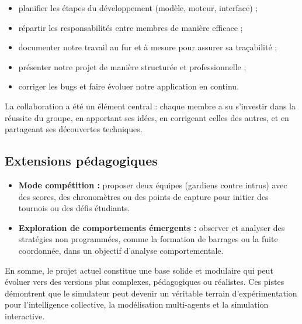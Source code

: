 \begin{itemize}
    \item planifier les étapes du développement (modèle, moteur, interface) ;
    \item répartir les responsabilités entre membres de manière efficace ;
    \item documenter notre travail au fur et à mesure pour assurer sa traçabilité ;
    \item présenter notre projet de manière structurée et professionnelle ;
    \item corriger les bugs et faire évoluer notre application en continu.
\end{itemize}

La collaboration a été un élément central : chaque membre a su s’investir dans la réussite du groupe, en apportant ses idées, en corrigeant celles des autres, et en partageant ses découvertes techniques.

\subsection{Extensions pédagogiques}

\begin{itemize}
    \item \textbf{Mode compétition :} proposer deux équipes (gardiens contre intrus) avec des scores, des chronomètres ou des points de capture pour initier des tournois ou des défis étudiants.

    \item \textbf{Exploration de comportements émergents :} observer et analyser des stratégies non programmées, comme la formation de barrages ou la fuite coordonnée, dans un objectif d’analyse comportementale.
    
   
\end{itemize}

\noindent En somme, le projet actuel constitue une base solide et modulaire qui peut évoluer vers des versions plus complexes, pédagogiques ou réalistes. Ces pistes démontrent que le simulateur peut devenir un véritable terrain d’expérimentation pour l’intelligence collective, la modélisation multi-agents et la simulation interactive.

